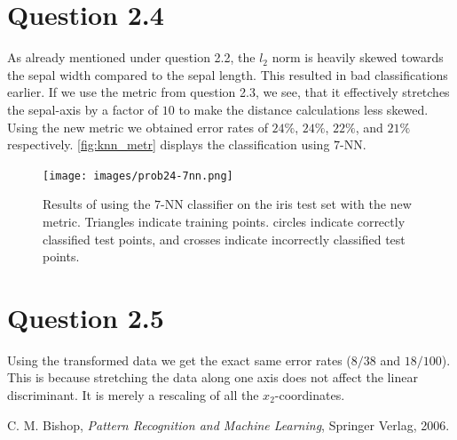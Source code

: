 \documentclass[11pt,a4paper]{article}
\begin{document}
\section{Question 2.4}
As already mentioned under question 2.2, the $l_2$ norm is heavily skewed
towards the sepal width compared to the sepal length. This resulted in bad
classifications earlier. If we use the metric from question 2.3, we see, that
it effectively stretches the sepal-axis by a factor of $10$ to make the
distance calculations less skewed. Using the new metric we obtained error rates
of $24\%$, $24\%$, $22\%$, and $21\%$ respectively. \autoref{fig:knn_metr}
displays the classification using $7$-NN.

\begin{figure}[htbp]
    \centering
    \texttt{[image: images/prob24-7nn.png]}
    \caption{Results of using the $7$-NN classifier on the iris test set with
    the new metric. Triangles indicate training points. circles indicate
    correctly classified test points, and crosses indicate incorrectly classified
    test points.}
    \label{fig:knn_metr}
\end{figure}

\section{Question 2.5}
Using the transformed data we get the exact same error rates ($8/38$ and
$18/100$). This is because stretching the data along one axis does not affect
the linear discriminant. It is merely a rescaling of all the $x_2$-coordinates.



\begin{thebibliography}{9}
        C. M. Bishop,
        \emph{Pattern Recognition and Machine Learning},
        Springer Verlag,
        2006.
\end{thebibliography}
\end{document}
